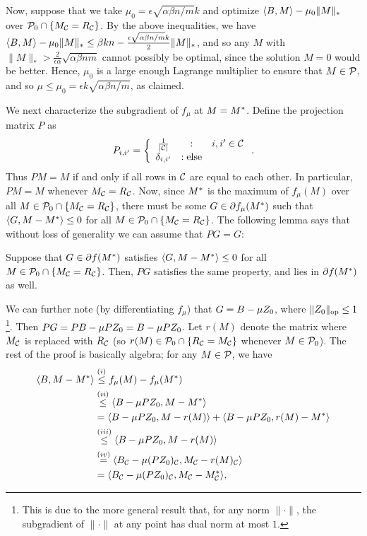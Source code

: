 Now, suppose that we take $\mu_0 = \epsilon \sqrt{\alpha\beta n/m}k$ and optimize $\langle B, M \rangle - \mu_0\|M\|_*$ over 
$\mathcal{P}_0 \cap \{M_{\mathcal{C}} = R_{\mathcal{C}}\}$. By the above inequalities, 
we have $\langle B, M \rangle - \mu_0\|M\|_* \leq \beta kn - \frac{\epsilon \sqrt{\alpha\beta n/m}k}{2}\|M\|_*$, 
and so any $M$ with $\|M\|_* > \frac{2}{\epsilon\alpha}\sqrt{\alpha\beta nm}$ 
cannot possibly be optimal, since the solution $M = 0$ would 
be better. Hence, $\mu_0$ is a large enough Lagrange multiplier to ensure that $M \in \mathcal{P}$, and so 
$\mu \leq \mu_0 = \epsilon k\sqrt{\alpha\beta n/m}$, as claimed.

We next characterize the subgradient of $f_{\mu}$ at $M = M^*$.
Define the projection matrix $P$ as
\[ P_{i,i'} = \left\{ \begin{array}{ccl} \frac{1}{|\mathcal{C}|} & : & i, i' \in \mathcal{C} \\ \delta_{i,i'} & : \text{else} \end{array} \right.. \]
Thus $PM = M$ if and only if all rows in $\mathcal{C}$ are equal to each other.
In particular, $PM = M$ whenever $M_{\mathcal{C}} = R_{\mathcal{C}}$. Now, since $M^*$ is the maximum 
of $f_{\mu}(M)$ over all $M \in \mathcal{P}_0 \cap \{M_{\mathcal{C}} = R_{\mathcal{C}}\}$, there must be some 
$G \in \partial f_{\mu}(M^*)$ such that $\langle G, M - M^* \rangle \leq 0$ for all $M \in \mathcal{P}_0 \cap \{M_{\mathcal{C}} = R_{\mathcal{C}}\}$. The following lemma says that without 
loss of generality we can assume that $PG = G$:
\begin{lemma}
\label{lem:subgradient-2}
Suppose that $G \in \partial f(M^*)$ satisfies $\langle G, M - M^* \rangle \leq 0$ 
for all $M \in \mathcal{P}_0 \cap \{M_{\mathcal{C}} = R_{\mathcal{C}}\}$. 
Then, $PG$ satisfies the same property, and lies in $\partial f(M^*)$ as well.
\end{lemma}
We can further note (by differentiating $f_{\mu}$) that 
$G = B - \mu Z_0$, where $\|Z_0\|_{\mathrm{op}} \leq 1$\footnote{This is due to the 
more general result that, for any norm $\|\cdot\|$, the subgradient of $\|\cdot\|$ 
at any point has dual norm at most $1$.}. Then
$PG = PB - \mu PZ_0 = B - \mu PZ_0$. Let $r(M)$ denote the 
matrix where $M_{\mathcal{C}}$ is replaced with $R_{\mathcal{C}}$ (so $r(M) \in \mathcal{P}_0 \cap \{R_{\mathcal{C}} = M_{\mathcal{C}}\}$ 
whenever $M \in \mathcal{P}_0$). The rest of the proof is basically algebra; for any 
$M \in \mathcal{P}$, we have
\begin{align}
\langle B, M - M^* \rangle &\stackrel{(i)}{\leq} f_{\mu}(M) - f_{\mu}(M^*) \\
 &\stackrel{(ii)}{\leq} \langle B - \mu PZ_0, M - M^* \rangle \\
 &= \langle B - \mu PZ_0, M - r(M) \rangle + \langle B - \mu PZ_0, r(M) - M^* \rangle \\
 &\stackrel{(iii)}{\leq} \langle B - \mu PZ_0, M - r(M) \rangle \\
 &\stackrel{(iv)}{=} \langle B_{\mathcal{C}} - \mu (PZ_0)_{\mathcal{C}}, M_{\mathcal{C}} - r(M)_{\mathcal{C}} \rangle \\
 &= \langle B_{\mathcal{C}} - \mu (PZ_0)_{\mathcal{C}}, M_{\mathcal{C}} - M^*_{\mathcal{C}} \rangle,
\end{align}
